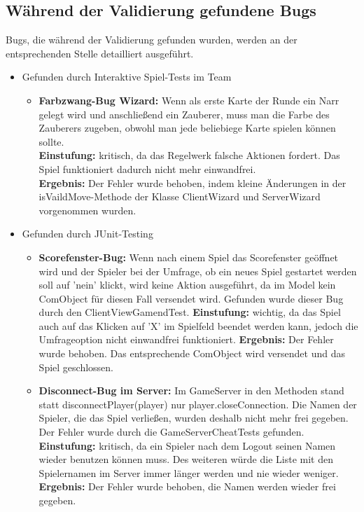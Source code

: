 \documentclass[a4paper]{article}
\begin{document}
\subsection{Während der Validierung gefundene Bugs}
	Bugs, die während der Validierung gefunden wurden, werden an der entsprechenden Stelle detailliert ausgeführt.
	\begin{itemize}
	\item Gefunden durch Interaktive Spiel-Tests im Team
	\begin{itemize}
	\item{\textbf{Farbzwang-Bug Wizard:}} Wenn als erste Karte der Runde ein Narr gelegt wird und anschließend ein Zauberer, muss man die Farbe des Zauberers zugeben, obwohl man jede beliebiege Karte spielen können sollte.\\
	\textbf{Einstufung:} kritisch, da das Regelwerk falsche Aktionen fordert. Das Spiel funktioniert dadurch nicht mehr einwandfrei.\\
	\textbf{Ergebnis:} Der Fehler wurde behoben, indem kleine Änderungen in der isVaildMove-Methode der Klasse ClientWizard und ServerWizard vorgenommen wurden.
	\end{itemize}
	\item Gefunden durch JUnit-Testing
	\begin{itemize}
	\item{\textbf{Scorefenster-Bug:}} Wenn nach einem Spiel das Scorefenster geöffnet wird und der Spieler bei der Umfrage, ob ein neues Spiel gestartet werden soll auf 'nein' klickt, wird keine Aktion ausgeführt, da im Model kein ComObject für diesen Fall versendet wird. Gefunden wurde dieser Bug durch den ClientViewGamendTest.
	\textbf{Einstufung:} wichtig, da das Spiel auch auf das Klicken auf 'X' im Spielfeld beendet werden kann, jedoch die Umfrageoption nicht einwandfrei funktioniert.
	\textbf{Ergebnis:} Der Fehler wurde behoben. Das entsprechende ComObject wird versendet und das Spiel geschlossen. 
	
	\item{\textbf{Disconnect-Bug im Server:}} Im GameServer in den Methoden stand statt disconnectPlayer(player) nur player.closeConnection. Die Namen der Spieler, die das Spiel verließen, wurden deshalb nicht mehr frei gegeben.
Der Fehler wurde durch die GameServerCheatTests gefunden.\\
	\textbf{Einstufung:} kritisch, da ein Spieler nach dem Logout seinen Namen wieder benutzen können muss. Des weiteren würde die Liste mit den Spielernamen im Server immer länger werden und nie wieder weniger.\\
	\textbf{Ergebnis:} Der Fehler wurde behoben, die Namen werden wieder frei gegeben.
	\end{itemize}
\end{itemize}
 
\end{document}
